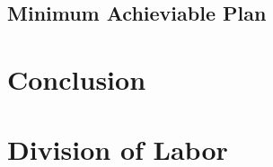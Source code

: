 \documentclass[a4paper, 11pt]{article}
\begin{document}
\subsection{Minimum Achieviable Plan}
\section{Conclusion}
\section*{Division of Labor}
















\nocite{*}
{\small


}
\end{document}
